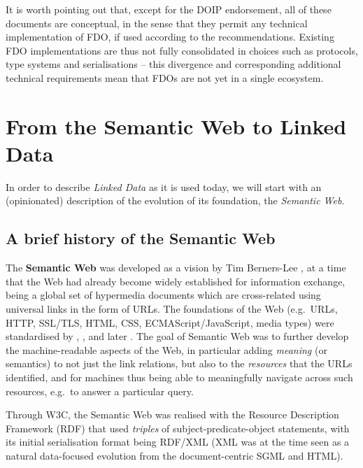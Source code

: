 It is worth pointing out that, except for the DOIP endorsement, all of these documents are conceptual, in the sense that they permit any technical implementation of FDO, if used according to the recommendations. 
Existing FDO implementations \cite{Wittenburg 2022a} are thus not fully consolidated in choices such as protocols, type systems and serialisations -- this divergence and corresponding additional technical requirements mean that FDOs are not yet in a single ecosystem.


\section{From the Semantic Web to Linked Data}\label{ch3:ld}

In order to describe \emph{Linked Data} as it is used today, we will start with an (opinionated) description of the evolution of its foundation, the \emph{Semantic Web}.

\subsection{A brief history of the Semantic Web}\label{ch3:semweb}

The \textbf{Semantic Web} was developed as a vision by Tim Berners-Lee \cite{Berners-Lee 1999}, at a time that the Web had already become widely established for information exchange, being a global set of hypermedia documents which are cross-related using universal links in the form of URLs. The foundations of the Web (e.g.~URLs, HTTP, SSL/TLS, HTML, CSS, ECMAScript/JavaScript, media types) were standardised by , ,  and later . The goal of Semantic Web was to further develop the machine-readable aspects of the Web, in particular adding \emph{meaning} (or semantics) to not just the link relations, but also to the \emph{resources} that the URLs identified, and for machines thus being able to meaningfully navigate across such resources, e.g.~to answer a particular query.

Through W3C, the Semantic Web was realised with the Resource Description Framework (RDF) \cite{Schreiber 2014} that used \emph{triples} of subject-predicate-object statements, with its initial serialisation format \cite{Lassila 1999} being RDF/XML (XML was at the time seen as a natural data-focused evolution from the document-centric SGML and HTML).

